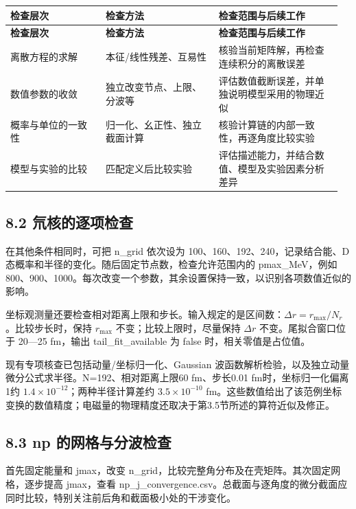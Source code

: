 \documentclass[UTF8,a4paper,zihao=5,fontset=fandol]{ctexart}
\begin{document}
{\small\setlength{\tabcolsep}{3pt}\renewcommand{\arraystretch}{1.28}
\begin{longtable}{@{}>{\raggedright\arraybackslash}p{0.2784\linewidth}>{\raggedright\arraybackslash}p{0.3264\linewidth}>{\raggedright\arraybackslash}p{0.3552\linewidth}@{}}\toprule
\textbf{检查层次} & \textbf{检查方法} & \textbf{检查范围与后续工作}\\\midrule
\endfirsthead
\textbf{检查层次} & \textbf{检查方法} & \textbf{检查范围与后续工作}\\\midrule
\endhead
离散方程的求解 & 本征/线性残差、互易性 & 核验当前矩阵解，再检查连续积分的离散误差\\
数值参数的收敛 & 独立改变节点、上限、分波等 & 评估数值截断误差，并单独说明模型采用的物理近似\\
概率与单位的一致性 & 归一化、幺正性、独立截面计算 & 核验计算链的内部一致性，再逐角度比较实验\\
模型与实验的比较 & 匹配定义后比较实验 & 评估描述能力，并结合数值、模型及实验因素分析差异\\
\bottomrule\end{longtable}}
\subsection*{8.2 氘核的逐项检查}
在其他条件相同时，可把 {\ttfamily\small n\_\allowbreak{}grid} 依次设为 100、160、192、240，记录结合能、D 态概率和半径的变化。随后固定节点数，检查允许范围内的 {\ttfamily\small pmax\_\allowbreak{}MeV}，例如 800、900、1000。每次改变一个参数，其余设置保持一致，以识别各项数值近似的影响。

坐标观测量还要检查相对距离上限和步长。输入规定的是区间数：\(\Delta r=r_{\max}/N_r\)。比较步长时，保持 \(r_{\max}\) 不变；比较上限时，尽量保持 \(\Delta r\) 不变。尾拟合窗口位于 20—25 fm，输出 {\ttfamily\small tail\_\allowbreak{}fit\_\allowbreak{}available} 为 false 时，相关零值是占位值。

现有专项核查已包括动量/坐标归一化、Gaussian 波函数解析检验，以及独立动量微分公式求半径。N=192、相对距离上限60 fm、步长0.01 fm时，坐标归一化偏离1约 \(1.4\times10^{-12}\)；两种半径计算差约 \(3.5\times10^{-10}\) fm。这些数值给出了该范例坐标变换的数值精度；电磁量的物理精度还取决于第3.5节所述的算符近似及修正。

\subsection*{8.3 np 的网格与分波检查}
首先固定能量和 {\ttfamily\small jmax}，改变 {\ttfamily\small n\_\allowbreak{}grid}，比较完整角分布及在壳矩阵。其次固定网格，逐步提高 {\ttfamily\small jmax}，查看 {\ttfamily\small np\_\allowbreak{}j\_\allowbreak{}convergence.\allowbreak{}csv}。总截面与逐角度的微分截面应同时比较，特别关注前后角和截面极小处的干涉变化。
\end{document}

